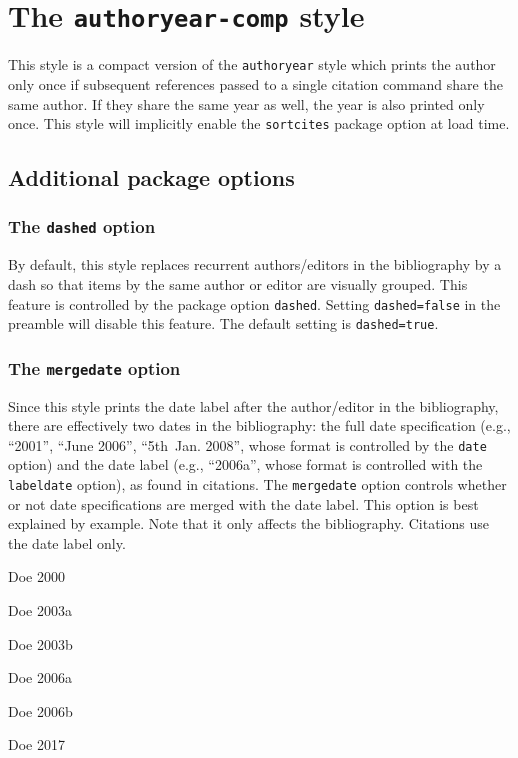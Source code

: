 \documentclass[a4paper]{article}
\newenvironment{bibsample}
  {\trivlist\samepage
   \setlength{\itemsep}{0pt}}
  {\endtrivlist}
\begin{document}
\section*{The \texttt{authoryear-comp} style}

This style is a compact version of the \texttt{authoryear} style
which prints the author only once if subsequent references passed to
a single citation command share the same author. If they share the
same year as well, the year is also printed only once. This style
will implicitly enable the \texttt{sortcites} package option at load
time.

\subsection*{Additional package options}

\subsubsection*{The \texttt{dashed} option}

By default, this style replaces recurrent authors/editors in the
bibliography by a dash so that items by the same author or editor
are visually grouped. This feature is controlled by the package
option \texttt{dashed}. Setting \texttt{dashed=false} in the
preamble will disable this feature. The default setting is
\texttt{dashed=true}.

\subsubsection*{The \texttt{mergedate} option}

Since this style prints the date label after the author/editor in the
bibliography, there are effectively two dates in the bibliography:
the full date specification (e.g., \enquote{2001}, \enquote{June
2006}, \enquote{5th~Jan. 2008}, whose format is controlled by the
\texttt{date} option) and the date label (e.g., \enquote{2006a},
whose format is controlled with the \texttt{labeldate} option),
as found in citations. The \texttt{mergedate} option controls whether
or not date specifications are merged with the date label.
This option is best explained by example. Note that
it only affects the bibliography. Citations use the date label only.

\begin{bibsample}
\item Doe 2000
\item Doe 2003a
\item Doe 2003b
\item Doe 2006a
\item Doe 2006b
\item Doe 2017
\end{bibsample}
\end{document}
